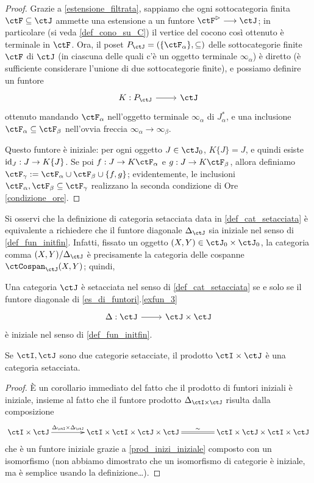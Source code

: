 \begin{proof}
	Grazie a \ref{estensione_filtrata}, sappiamo che ogni sottocategoria finita \(\ctF\subseteq\ctJ\) ammette una estensione a un funtore \(\ctF^\rhd\fun\ctJ\); in particolare (si veda \ref{def_cono_su_C}) il vertice del cocono così ottenuto è terminale in \(\ctF\). Ora, il poset \(P_\ctJ = (\{\ctF_\alpha\},\subseteq)\) delle sottocategorie finite \(\ctF\) di \(\ctJ\) (in ciascuna delle quali c'è un oggetto terminale \(\infty_\alpha\)) è diretto (è sufficiente considerare l'unione di due sottocategorie finite), e possiamo definire un funtore
	\[\dmFun{K}{P_\ctJ}{\ctJ}\]
	ottenuto mandando \(\ctF_\alpha\) nell'oggetto terminale \(\infty_\alpha\) di \(J_\alpha^*\), e una inclusione \(\ctF_\alpha\subseteq\ctF_\beta\) nell'ovvia freccia \(\infty_\alpha\to\infty_\beta\).

	Questo funtore è iniziale: per ogni oggetto \(J\in\ctJ_0\), \(K\{J\}=J\), e quindi esiste \(\Id[J] : J\to K\{J\}\). Se poi \(f : J\to K\ctF_\alpha\) e \(g : J\to K\ctF_\beta\), allora definiamo \(\ctF_\gamma := \ctF_\alpha\cup\ctF_\beta\cup\{f,g\}\); evidentemente, le inclusioni \(\ctF_\alpha,\ctF_\beta\subseteq\ctF_\gamma\) realizzano la seconda condizione di Ore \ref{condizione_ore}.
\end{proof}
Si osservi che la definizione di categoria setacciata data in \ref{def_cat_setacciata} è equivalente a richiedere che il funtore diagonale \(\Delta_\ctJ\) sia iniziale nel senso di \ref{def_fun_initfin}. Infatti, fissato un oggetto \((X,Y)\in\ctJ_0\times\ctJ_0\), la categoria comma \((X,Y)/\Delta_\ctJ\) è precisamente la categoria delle cospanne \(\ctCospan_\ctJ(X,Y)\); quindi,
\begin{theorem}\label{thm_catprod_setacciata}
	Una categoria \(\ctJ\) è setacciata nel senso di \ref{def_cat_setacciata} se e solo se il funtore diagonale di \ref{es_di_funtori}.\ref{exfun_3}
	\[\dmFun{\Delta}{\ctJ}{\ctJ\times\ctJ}\]
	è iniziale nel senso di \ref{def_fun_initfin}.
\end{theorem}
\begin{theorem}
	Se \(\ctI,\ctJ\) sono due categorie setacciate, il prodotto \(\ctI\times\ctJ\) è una categoria setacciata.
\end{theorem}
\begin{proof}
	\`E un corollario immediato del fatto che il prodotto di funtori iniziali è iniziale,  insieme al fatto che il funtore prodotto \(\Delta_{\ctI\times\ctJ}\) risulta dalla composizione
	\[\xymatrix@C=1.5cm{
		\ctI\times\ctJ \ar[r]^-{\Delta_\ctI\times\Delta_\ctJ} & \ctI\times\ctI\times \ctJ\times\ctJ\ar@{=}[r]^\sim & \ctI\times\ctJ\times \ctI\times\ctJ
		}\]
	che è un funtore iniziale grazie a \ref{prod_inizi_iniziale} composto con un isomorfismo (non abbiamo dimostrato che un isomorfismo di categorie è iniziale, ma è semplice usando la definizione\dots).
\end{proof}
